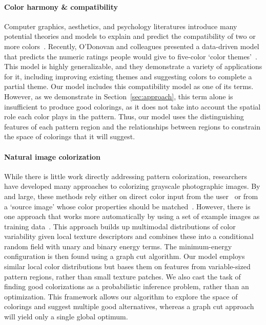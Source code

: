 \paragraph{Color harmony \& compatibility}
Computer graphics, aesthetics, and psychology literatures introduce many potential theories and models to explain and predict the compatibility of two or more colors~\cite{CohenOrHarmonization,Munsell,PalmerColorPreference}. Recently, O'Donovan and colleagues presented a data-driven model that predicts the numeric ratings people would give to five-color `color themes'~. This model is highly generalizable, and they demonstrate a variety of applications for it, including improving existing themes and suggesting colors to complete a partial theme. Our model includes this compatibility model as one of its terms. However, as we demonstrate in Section~\ref{sec:approach}, this term alone is insufficient to produce good colorings, as it does not take into account the spatial role each color plays in the pattern. Thus, our model uses the distinguishing features of each pattern region and the relationships between regions to constrain the space of colorings that it will suggest.

\paragraph{Natural image colorization}
While there is little work directly addressing pattern colorization, researchers have developed many approaches to colorizing grayscale photographic images. By and large, these methods rely either on direct color input from the user~\cite{ScribbleColorization} or from a `source image' whose color properties should be matched~\cite{TransferColorization}. However, there is one approach that works more automatically by using a set of example images as training data~\cite{MultimodalColorization}. This approach builds up multimodal distributions of color variability given local texture descriptors and combines these into a conditional random field with unary and binary energy terms. The minimum-energy configuration is then found using a graph cut algorithm. Our model employs similar local color distributions but bases them on features from variable-sized pattern regions, rather than small texture patches. We also cast the task of finding good colorizations as a probabilistic inference problem, rather than an optimization. This framework allows our algorithm to explore the space of colorings and suggest multiple good alternatives, whereas a graph cut approach will yield only a single global optimum.

